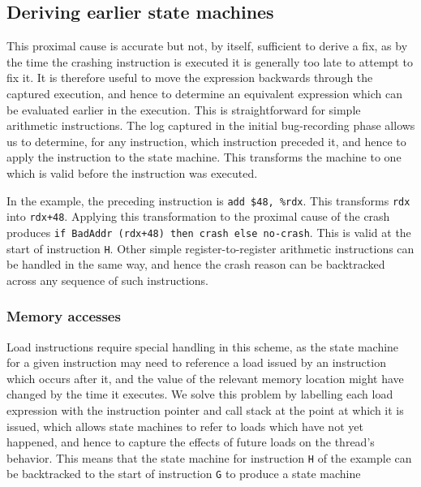 \documentclass[10pt,twocolumn,preprint,natbib,authoryear]{sigplanconf}
\newcommand{\editorial}[1]{}
\begin{document}
\subsection{Deriving earlier state machines}
This proximal cause is accurate but not, by itself, sufficient to
derive a fix, as by the time the crashing instruction is executed it
is generally too late to attempt to fix it.  It is therefore useful to
move the expression backwards through the captured execution, and
hence to determine an equivalent expression which can be evaluated
earlier in the execution.  This is straightforward for simple
arithmetic instructions.  The log captured in the initial
bug-recording phase allows us to determine, for any instruction, which
instruction preceded it, and hence to apply the instruction to the
state machine.  This transforms the machine to one which is valid
before the instruction was executed.

In the example, the preceding instruction is \verb|add $48, %rdx|.
This transforms \verb|rdx| into \verb|rdx+48|.  Applying this
transformation to the proximal cause of the crash produces
\verb|if BadAddr (rdx+48) then crash else no-crash|.  This is valid at
the start of instruction \verb|H|.  Other simple register-to-register
arithmetic instructions can be handled in the same way, and hence the
crash reason can be backtracked across any sequence of such
instructions.

\editorial{Our implementation uses libVEX to decode x86 instructions
  into a sequence of micro-operations which can be used as input to
  this process.} 

\subsubsection{Memory accesses}

Load instructions require special handling in this scheme, as the
state machine for a given instruction may need to reference a load
issued by an instruction which occurs after it, and the value of the
relevant memory location might have changed by the time it executes.
We solve this problem by labelling each load expression with the
instruction pointer and call stack at the point at which it is issued,
which allows state machines to refer to loads which have not yet
happened, and hence to capture the effects of future loads on the
thread's behavior.  This means that the state machine for instruction
\verb|H| of the example can be backtracked to the start of instruction
\verb|G| to produce a state machine
\end{document}
